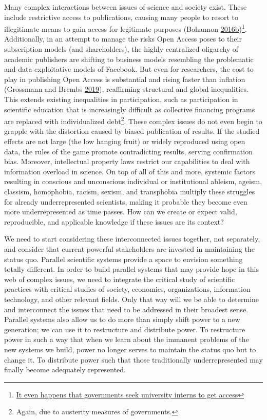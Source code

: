 \documentclass[a5paper]{book}
\let\rmarkdownfootnote\footnote%
\def\footnote{\protect\rmarkdownfootnote}
\begin{document}
Many complex interactions between issues of science and society exist.
These include restrictive access to publications, causing many people to
resort to illegitimate means to gain access for legitimate purposes
(Bohannon
\protect\hyperlink{ref-doi:10.1126ux2fscience.352.6285.508}{2016}\protect\hyperlink{ref-doi:10.1126ux2fscience.352.6285.508}{b})\footnote{\href{https://therostrumblog.wordpress.com/2015/01/12/why-all-phd-students-should-do-a-policy-placement/}{It
  even happens that governments seek university interns to get access}}.
Additionally, in an attempt to manage the risks Open Access poses to
their subscription models (and shareholders), the highly centralized
oligarchy of academic publishers are shifting to business models
resembling the problematic and data-exploitative models of Facebook. But
even for researchers, the cost to play in publishing Open Access is
substantial and rising faster than inflation (Grossmann and Brembs
\protect\hyperlink{ref-doi:10.7287ux2fpeerj.preprints.27809v1}{2019}),
reaffirming structural and global inequalities. This extends existing
inequalities in participation, such as participation in scientific
education that is increasingly difficult as collective financing
programs are replaced with individualized debt\footnote{Again, due to
  austerity measures of governments.}. These complex issues do not even
begin to grapple with the distortion caused by biased publication of
results. If the studied effects are not large (the low hanging fruit) or
widely reproduced using open data, the rules of the game promote
contradicting results, serving confirmation bias. Moreover, intellectual
property laws restrict our capabilities to deal with information
overload in science. On top of all of this and more, systemic factors
resulting in conscious and unconscious individual or institutional
ableism, ageism, classism, homophobia, racism, sexism, and transphobia
multiply these struggles for already underrepresented scientists, making
it probable they become even more underrepresented as time passes. How
can we create or expect valid, reproducible, and applicable knowledge if
these issues are its context?

We need to start considering these interconnected issues together, not
separately, and consider that current powerful stakeholders are invested
in maintaining the status quo. Parallel scientific systems provide a
space to envision something totally different. In order to build
parallel systems that may provide hope in this web of complex issues, we
need to integrate the critical study of scientific practices with
critical studies of society, economics, organizations, information
technology, and other relevant fields. Only that way will we be able to
determine and interconnect the issues that need to be addressed in their
broadest sense. Parallel systems also allow us to do more than simply
shift power to a new generation; we can use it to restructure and
distribute power. To restructure power in such a way that when we learn
about the immanent problems of the new systems we build, power no longer
serves to maintain the status quo but to change it. To distribute power
such that those traditionally underrepresented may finally become
adequately represented.
\end{document}
